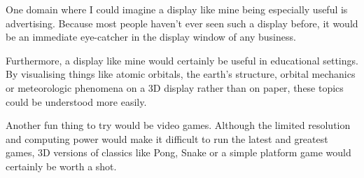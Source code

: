 \documentclass[a4paper, 11pt, titlepage]{article}
\begin{document}
One domain where I could imagine a display like mine being especially useful is advertising.
Because most people haven't ever seen such a display before, it would be an immediate eye-catcher
in the display window of any business.

Furthermore, a display like mine would certainly be useful in educational settings. By visualising
things like atomic orbitals, the earth's structure, orbital mechanics or meteorologic phenomena on
a 3D display rather than on paper, these topics could be understood more easily.

Another fun thing to try would be video games. Although the limited resolution and computing power
would make it difficult to run the latest and greatest games, 3D versions of classics like Pong,
Snake or a simple platform game would certainly be worth a shot.
\end{document}
